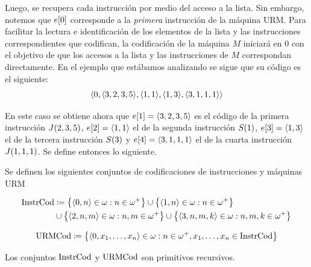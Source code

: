 Luego, se recupera cada instrucción por medio del acceso a la lista. Sin embargo, notemos que $e\bra*{0}$ corresponde a la \emph{primera} instrucción de la máquina URM. Para facilitar la lectura e identificación de los elementos de la lista y las instrucciones correspondientes que codifican, la codificación de la máquina $M$ iniciará en $0$ con el objetivo de que los accesos a la lista y las instrucciones de $M$ correspondan directamente. En el ejemplo que estábamos analizando se sigue que su código es el siguiente:
\[
	\inner*{0,\inner*{3, 2, 3, 5},\inner*{1, 1},\inner*{1, 3},\inner*{3, 1, 1, 1}}
\]

En este caso se obtiene ahora que $e\bra*{1} =\inner*{3, 2, 3, 5}$ es el código de la primera instrucción $J\pa*{2, 3, 5}$, $e\bra*{2} =\inner*{1, 1}$ el de la segunda instrucción $S\pa*{1}$, $e\bra*{3} =\inner*{1, 3}$ el de la tercera instrucción $S\pa*{3}$ y $e\bra*{4} =\inner*{3, 1, 1, 1}$ el de la cuarta instrucción $J\pa*{1, 1, 1}$.
Se define entonces lo siguiente.

\begin{definition}
	\label{def: codificacion_urm} %
	Se definen los siguientes conjuntos de codificaciones de instrucciones y máquinas URM

	\begin{align*}
		\INSTRUCCIONESCOD &\coloneqq\set*{\inner*{0, n}\in\omega: n\in\omega^{+}}\cup\set*{\inner*{1, n}\in\omega: n\in\omega^{+}}\\
		&\cup\set*{\inner*{2, n, m}\in\omega: n, m\in\omega^{+}}\cup\set*{\inner*{3, n, m, k}\in\omega: n, m, k\in\omega^{+}}
	\end{align*}

	\[
		\URMCODIGO\coloneqq\set*{\inner*{0, x_{1},\dotsc, x_{n}}\in\omega: n\in\omega^{+}, x_{1},\dotsc, x_{n}\in\INSTRUCCIONESCOD}
	\]
\end{definition}

\begin{theorem}
	\label{theo: instrcod_urmcod_primitivos} %
	Los conjuntos $\INSTRUCCIONESCOD$ y $\URMCODIGO$ son primitivos recursivos.
\end{theorem}

